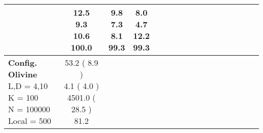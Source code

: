 \documentclass[9pt]{article}
\begin{document}
\begin{landscape}
\begin{longtable}{ l | c c c c | c c c c | c c c c | c c c c |}
             &
                            \makecell{              12.5
     \\
            {\footnotesize             9.3
    } \\  {\footnotesize             10.6
     } \\
            {\small \textcolor[rgb]{ 0.2 , 0.7 , 0.1} {100.0  }
} }
             &                         \makecell{              9.8
     \\
            {\footnotesize             7.3
    } \\  {\footnotesize             8.1
     } \\
            {\small \textcolor[rgb]{ 0.214 , 0.685 , 0.1} {99.3  }
} }
             &
                            \makecell{              \textbf{ 8.0 }
     \\
            {\footnotesize             4.7
    } \\  {\footnotesize             12.2
     } \\
            {\small \textcolor[rgb]{ 0.214 , 0.685 , 0.1} {99.3  }
} }
            

 \\
                                                            
                    \hline
                    \makecell{ \textbf{ Config. Olivine} \\
                    { \small L,D = 4,10} \\
                    {\small K = 100} \\
                    {\small N = 100000 } \\ {\small Local = 500 }} &
                    
                            \makecell{              53.2
     (             8.9
    ) \\
            {\footnotesize             4.1
     (              4.0
     )} \\
            {\footnotesize             4501.0
     (            28.5
    ) } \\
            {\small  \textcolor[rgb]{ 0.576 , 0.323 , 0.1} {81.2  }
} }



\end{longtable}
\end{landscape}
\end{document}
